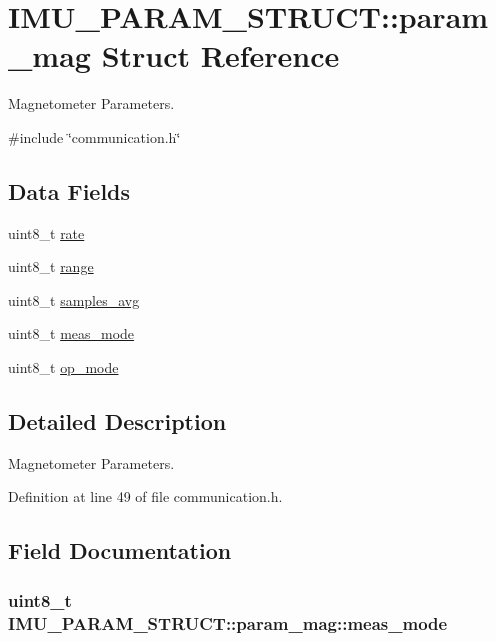\hypertarget{structIMU__PARAM__STRUCT_1_1param__mag}{\section{I\-M\-U\-\_\-\-P\-A\-R\-A\-M\-\_\-\-S\-T\-R\-U\-C\-T\-:\-:param\-\_\-mag Struct Reference}
\label{structIMU__PARAM__STRUCT_1_1param__mag}
}


Magnetometer Parameters.  




{\ttfamily \#include \char`\"{}communication.\-h\char`\"{}}

\subsection*{Data Fields}
\begin{DoxyCompactItemize}
\item 
uint8\-\_\-t \hyperlink{structIMU__PARAM__STRUCT_1_1param__mag_a234de95423b604b05b851ef90890cea1}{rate}
\item 
uint8\-\_\-t \hyperlink{structIMU__PARAM__STRUCT_1_1param__mag_a40ad27ebdb5fde35257b1dc52e40f476}{range}
\item 
uint8\-\_\-t \hyperlink{structIMU__PARAM__STRUCT_1_1param__mag_a52c22cae6940eb39fb72aca66cfeba9a}{samples\-\_\-avg}
\item 
uint8\-\_\-t \hyperlink{structIMU__PARAM__STRUCT_1_1param__mag_a1f3536709c05310005d648f339d70c54}{meas\-\_\-mode}
\item 
uint8\-\_\-t \hyperlink{structIMU__PARAM__STRUCT_1_1param__mag_a39b83b3e9ff5bdcafed0bdf6a2de584b}{op\-\_\-mode}
\end{DoxyCompactItemize}


\subsection{Detailed Description}
Magnetometer Parameters. 

Definition at line 49 of file communication.\-h.



\subsection{Field Documentation}
\hypertarget{structIMU__PARAM__STRUCT_1_1param__mag_a1f3536709c05310005d648f339d70c54}{
\subsubsection[{meas\-\_\-mode}]{\setlength{\rightskip}{0pt plus 5cm}uint8\-\_\-t I\-M\-U\-\_\-\-P\-A\-R\-A\-M\-\_\-\-S\-T\-R\-U\-C\-T\-::param\-\_\-mag\-::meas\-\_\-mode}}\label{structIMU__PARAM__STRUCT_1_1param__mag_a1f3536709c05310005d648f339d70c54}


